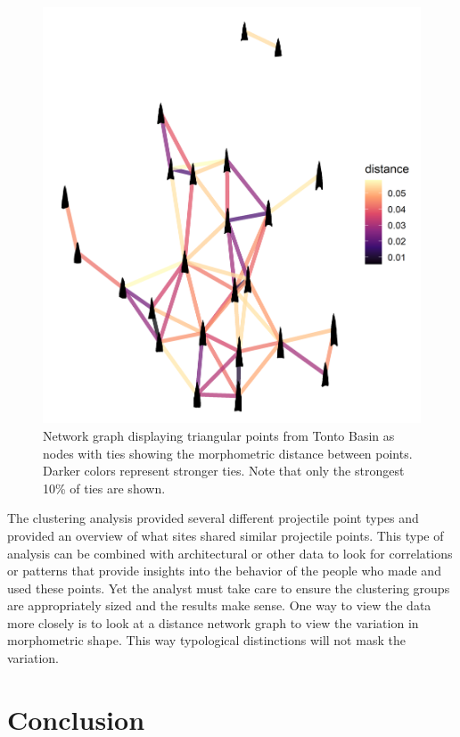 \documentclass{article}
\begin{document}
\begin{figure}
\includegraphics[width=1\linewidth]{figures/TontoTriangularDistanceNetwork} \caption{Network graph displaying triangular points from Tonto Basin as nodes with ties showing the morphometric distance between points. Darker colors represent stronger ties. Note that only the strongest 10\% of ties are shown.}\label{fig:TontoTriangularDistanceNetwork}
\end{figure}

The clustering analysis provided several different projectile point
types and provided an overview of what sites shared similar projectile
points. This type of analysis can be combined with architectural or
other data to look for correlations or patterns that provide insights
into the behavior of the people who made and used these points. Yet the
analyst must take care to ensure the clustering groups are appropriately
sized and the results make sense. One way to view the data more closely
is to look at a distance network graph to view the variation in
morphometric shape. This way typological distinctions will not mask the
variation.

\hypertarget{conclusion}{%
\section{Conclusion}\label{conclusion}}
\end{document}
